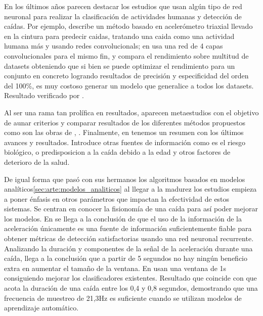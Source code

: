 En los últimos años parecen destacar los estudios que usan algún tipo de red neuronal \cite{Musci2020,Shi2020,Casilari2020,Liu2020} para realizar la clasificación de actividades humanas y detección de caídas. Por ejemplo,  describe un método basado en acelerómetro triaxial llevado en la cintura para predecir caidas, tratando una caida como una actividad humana más y usando redes convolucionals; en  usa una red de 4 capas convolucionales para el mismo fin, y compara el rendimiento sobre multitud de datasets obteniendo que si bien se puede optimizar el rendimiento para un conjunto en concreto logrando resultados de precisión y especificidad del orden del 100\%, es muy costoso generar un modelo que generalice a todos los datasets. Resultado verificado por .

Al ser una rama tan prolífica en resultados, aparecen metaestudios con el objetivo de aunar criterios y comparar resultados de los diferentes métodos propuestos como son las obras de , . Finalmente, en \cite{Anita2020} tenemos un resumen con los últimos avances y resultados. Introduce otras fuentes de información como es el riesgo biológico, o predisposicion a la caída debido a la edad y otros factores de deterioro de la salud.

De igual forma que pasó con sus hermanos los algoritmos basados en modelos analíticos\ref{sec:arte:modelos_analiticos} al llegar a la madurez los estudios empieza a poner énfasis en otros parámetros que impactan la efectividad de estos sistemas. Se centran en conocer la fisionomía de una caída para así poder mejorar los modelos. En \cite[p.6]{Musci2020} se llega a la conclusión de que el uso de la información de la aceleración únicamente es una fuente de información suficientemente fiable para obtener métricas de detección satisfactorias usando una red neuronal recurrente. Analizando la duración y componentes de la señal de la aceleración durante una caída,  llega a la conclusión que a partir de 5 segundos no hay ningún beneficio extra en aumentar el tamaño de la ventana. En \cite[p.59]{Hassan2019} usan una ventana de 1s consiguiendo mejorar los clasificadores existentes. Resultado que coincide con \cite[p.2]{Liu2018} que acota la duración de una caída entre los 0,4 y 0,8 segundos, demostrando que una frecuencia de muestreo de 21,3Hz es suficiente cuando se utilizan modelos de aprendizaje automático.  


